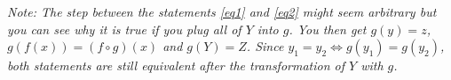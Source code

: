 \documentclass{article}
\begin{document}
\emph{Note: The step between the statements \ref{eq1} and \ref{eq2} might seem arbitrary but you can see why it is true if you plug all of $Y$ into $g$.
	You then get $g(y)=z$, $g(f(x))=(f\circ g)(x)$ and $g(Y)=Z$. Since $y_1=y_2\Leftrightarrow g(y_1)=g(y_2)$, both statements are still equivalent after the transformation of $Y$ with $g$.}
\end{document}
